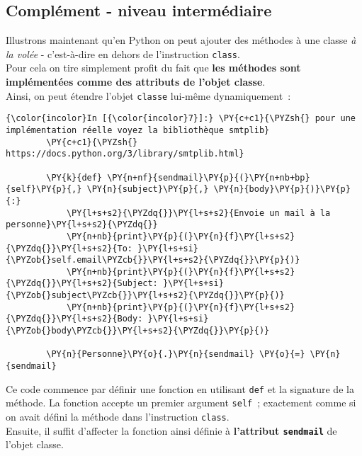     \hypertarget{compluxe9ment---niveau-intermuxe9diaire}{%
\subsection{Complément - niveau
intermédiaire}\label{compluxe9ment---niveau-intermuxe9diaire}}

    Illustrons maintenant qu'en Python on peut ajouter des méthodes à une
classe \emph{à la volée} - c'est-à-dire en dehors de l'instruction
\texttt{class}.\\

Pour cela on tire simplement profit du fait que \textbf{les méthodes
sont implémentées comme des attributs de l'objet classe}.\\

    Ainsi, on peut étendre l'objet \texttt{classe} lui-même dynamiquement~:

    \begin{Verbatim}[commandchars=\\\{\}]
{\color{incolor}In [{\color{incolor}7}]:} \PY{c+c1}{\PYZsh{} pour une implémentation réelle voyez la bibliothèque smtplib}
        \PY{c+c1}{\PYZsh{} https://docs.python.org/3/library/smtplib.html}
        
        \PY{k}{def} \PY{n+nf}{sendmail}\PY{p}{(}\PY{n+nb+bp}{self}\PY{p}{,} \PY{n}{subject}\PY{p}{,} \PY{n}{body}\PY{p}{)}\PY{p}{:}
            \PY{l+s+s2}{\PYZdq{}}\PY{l+s+s2}{Envoie un mail à la personne}\PY{l+s+s2}{\PYZdq{}}
            \PY{n+nb}{print}\PY{p}{(}\PY{n}{f}\PY{l+s+s2}{\PYZdq{}}\PY{l+s+s2}{To: }\PY{l+s+si}{\PYZob{}self.email\PYZcb{}}\PY{l+s+s2}{\PYZdq{}}\PY{p}{)}
            \PY{n+nb}{print}\PY{p}{(}\PY{n}{f}\PY{l+s+s2}{\PYZdq{}}\PY{l+s+s2}{Subject: }\PY{l+s+si}{\PYZob{}subject\PYZcb{}}\PY{l+s+s2}{\PYZdq{}}\PY{p}{)}
            \PY{n+nb}{print}\PY{p}{(}\PY{n}{f}\PY{l+s+s2}{\PYZdq{}}\PY{l+s+s2}{Body: }\PY{l+s+si}{\PYZob{}body\PYZcb{}}\PY{l+s+s2}{\PYZdq{}}\PY{p}{)}
            
        \PY{n}{Personne}\PY{o}{.}\PY{n}{sendmail} \PY{o}{=} \PY{n}{sendmail}
\end{Verbatim}


    Ce code commence par définir une fonction en utilisant \texttt{def} et
la signature de la méthode. La fonction accepte un premier argument
\texttt{self}~; exactement comme si on avait défini la méthode dans
l'instruction \texttt{class}.\\

Ensuite, il suffit d'affecter la fonction ainsi définie à
\textbf{l'attribut \texttt{sendmail}} de l'objet classe.\\

